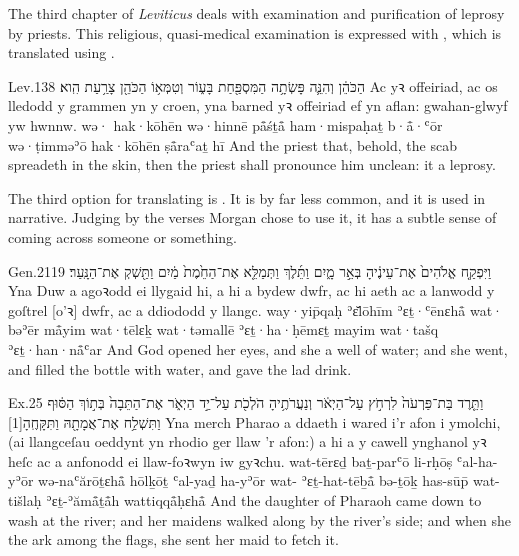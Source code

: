 
\begin{paper}
	The third chapter of \emph{Leviticus} deals with examination and purification of leprosy by priests. This religious, quasi-medical examination is expressed with , which is translated using .
\end{paper}

\begin{example}{Lev.}{13}{8}{}{}
	\quoling
	{ הַכֹּהֵ֔ן וְהִנֵּ֛ה פָּשְׂתָ֥ה הַמִּסְפַּ֖חַת בָּע֑וֹר וְטִמְּא֥וֹ הַכֹּהֵ֖ן צָרַ֥עַת הִֽוא׃}
	{Ac  yꝛ offeiriad, ac os lledodd y grammen yn y croen, yna barned yꝛ offeiriad ef yn aflan: gwahan-glwyf yw hwnnw.}
	{wə· hak·kōhēn wə·hinnē på̄śṯå̄ ham·mispaḥaṯ b·å̄·ʿōr wə·ṭimməʾō hak·kōhēn ṣå̄raʿaṯ hī}
	{And  the priest  that, behold, the scab spreadeth in the skin, then the priest shall pronounce him unclean: it  a leprosy.}
\end{example}




\begin{paper}
	The third option for translating  is . It is by far less common, and it is used in narrative. Judging by the verses Morgan chose to use it, it has a subtle sense of coming across someone or something.
\end{paper}

\begin{example}{Gen.}{21}{19}{}{}
	\quoling
	{וַיִּפְקַ֤ח אֱלֹהִים֙ אֶת־עֵינֶ֔יהָ  בְּאֵ֣ר מָ֑יִם וַתֵּ֜לֶךְ וַתְּמַלֵּ֤א אֶת־הַחֵ֙מֶת֙ מַ֔יִם וַתַּ֖שְׁקְ אֶת־הַנָּֽעַר׃}
	{Yna Duw a agoꝛodd ei llygaid hi, a hi a  bydew dwfr, ac hi aeth ac a lanwodd y goſtrel [o’ꝛ] dwfr, ac a ddiododd y llangc.}
	{way·yip̄qaḥ ʾɛ̆lōhīm ʾɛṯ·ʿēnɛhå̄ wat· bəʾēr må̄yim wat·tēlɛḵ wat·təmallē ʾɛṯ·ha·ḥēmɛṯ mayim wat·tašq ʾɛṯ·han·nå̄ʿar}
	{And God opened her eyes, and she  a well of water; and she went, and filled the bottle with water, and gave the lad drink.}
\end{example}

\begin{example}{Ex.}{2}{5}{}{}
	\quoling
	{וַתֵּ֤רֶד בַּת־פַּרְעֹה֙ לִרְחֹ֣ץ עַל־הַיְאֹ֔ר וְנַעֲרֹתֶ֥יהָ הֹלְכֹ֖ת עַל־יַ֣ד הַיְאֹ֑ר  אֶת־הַתֵּבָה֙ בְּת֣וֹךְ הַסּ֔וּף וַתִּשְׁלַ֥ח אֶת־אֲמָתָ֖הּ וַתִּקָּחֶֽהָ‪[1]‬}
	{Yna merch Pharao a ddaeth i wared i’r afon i ymolchi, (ai llangceſau oeddynt yn rhodio ger llaw ’r afon:) a hi a  y cawell ynghanol yꝛ heſc ac a anfonodd ei llaw-foꝛwyn iw gyꝛchu.}
	{wat-tērɛḏ baṯ-parʿō li-rḥōṣ ʿal-ha-yʾōr wə-naʿărōṯɛhå̄ hōlḵōṯ ʿal-yaḏ ha-yʾōr wat- ʾɛṯ-hat-tēḇå̄ bə-ṯōḵ has-sūp̄ wat-tišlaḥ ʾɛṯ-ʾămå̄ṯå̄h wattiqqå̄ḥɛhå̄}
	{And the daughter of Pharaoh came down to wash  at the river; and her maidens walked along by the river's side; and when she  the ark among the flags, she sent her maid to fetch it.}
\end{example}



